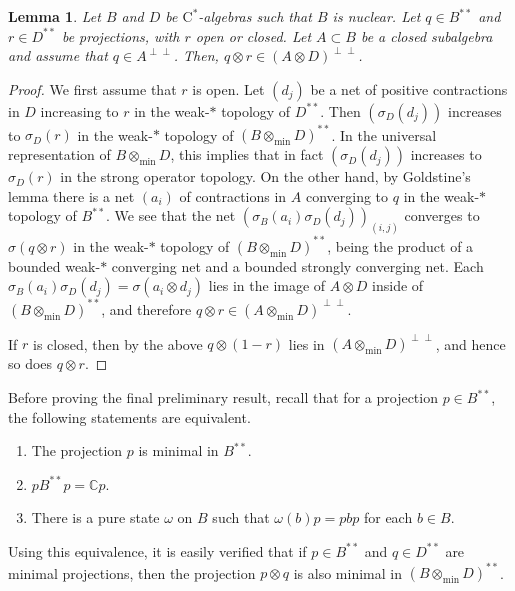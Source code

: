\documentclass[10pt]{amsart}
\newcommand{\bC}{{\mathbb{C}}}
\newcommand{\rC}{\mathrm{C}}
\newtheorem{lemma}{Lemma}[section]
\theoremstyle{definition}
\begin{document}
\begin{lemma}\label{L:tensorAperpperp}
Let $B$ and $D$ be 
 $\rC^*$-algebras such that $B$ is nuclear. Let $q\in B^{**}$ and $r\in D^{**}$ be projections, with $r$ 
 open or closed. Let $A\subset B$ be a 
 closed subalgebra and assume that $q\in A^{\perp\perp}$. Then, $q\otimes r\in (A\otimes D)^{\perp\perp}$.
\end{lemma}
\begin{proof} 
We first assume that $r$ is open.  
Let $(d_j)$ be a net of positive contractions in $D$ increasing to $r$ in the weak-$*$ topology of $D^{**}$. Then $(\sigma_D(d_j))$ increases to $\sigma_D(r)$ in the weak-$*$ topology of $(B\otimes_{\min} D)^{**}$. 
In the universal representation of $B\otimes_{\min}D$, this implies that in fact $(\sigma_D(d_j))$ increases to $\sigma_D(r)$ in  the strong operator topology. On the other hand, 
by Goldstine's lemma there is a net $(a_i)$ of contractions in $A$ converging to $q$ in the weak-$*$ topology of $B^{**}$.   We see that the net $(\sigma_B(a_i)\sigma_D(d_j))_{(i,j)}$ converges to $\sigma(q\otimes r)$ in the weak-$*$ topology of $(B\otimes_{\min} D)^{**}$,
being  the product of a 
bounded weak-$*$ converging net and a bounded strongly converging net. Each $\sigma_B(a_i)\sigma_D(d_j)=\sigma(a_i\otimes d_j)$ lies in the image of $A\otimes D$ inside of $(B\otimes_{\min} D)^{**}$, and therefore $q\otimes r \in (A\otimes_{\min} D)^{\perp\perp}$.

If $r$ is closed, then by the above $q\otimes (1-r)$ lies in $(A\otimes_{\min} D)^{\perp\perp}$, and hence so does $q\otimes r$.
\end{proof}



Before proving the final preliminary result, recall that for a projection $p\in B^{**}$, the following statements are equivalent.
\begin{enumerate}[{\rm (i)}]
\item The projection $p$ is minimal in $B^{**}$.
\item $pB^{**}p=\bC p$.
\item 
There is a pure state $\omega$ on $B$ such that $\omega(b)p=pbp$ for each $b\in B$. 
\end{enumerate}
Using this equivalence, it is easily verified that if $p\in B^{**}$ and $q\in D^{**}$ are minimal projections, then the projection $p\otimes q$ is also minimal in $(B\otimes_{\min}D)^{**}$.
\end{document}
